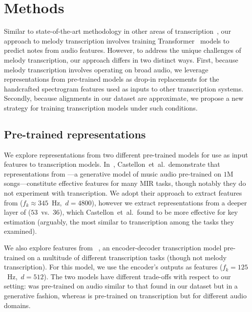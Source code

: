 \section{Methods}

Similar to state-of-the-art methodology in other areas of transcription~\cite{hawthorne2021sequence}, 
our approach to melody transcription involves training Transformer~\cite{vaswani2017attention} models to predict notes from audio features. 
However, to address the unique challenges of melody transcription, our approach differs in two distinct ways. 
First, because melody transcription involves operating on broad audio, we leverage representations from pre-trained models as drop-in replacements for the handcrafted spectrogram features used as inputs to other transcription systems. 
Secondly, because alignments in our dataset are approximate, we propose a new strategy for training transcription models under such conditions.

\subsection{Pre-trained representations}
\label{sec:representations}

We explore representations from two different pre-trained models for use as input features to transcription models.
In~\cite{castellon2021calm}, Castellon~et~al.\ demonstrate that representations from \jukebox---a generative model of music audio pre-trained on $1$M songs---constitute effective features for many MIR tasks, though notably they do not experiment with transcription. 
We adopt their approach to extract features from \jukebox{} (${f_k \approx 345}$~Hz,~${d = 4800}$), however we extract representations from a deeper layer of \jukebox{} ($53$~vs.~$36$), which Castellon~et~al.\ found to be more effective for key estimation (arguably, the most similar to transcription among the tasks they examined).

We also explore features from \mtthree~\cite{gardner2021mt3}, an encoder-decoder transcription model pre-trained on a multitude of different transcription tasks (though not melody transcription). 
For this model, we use the encoder's outputs as features (${f_k = 125}$~Hz,~${d = 512}$). 
The two models have different trade-offs with respect to our setting: \jukebox{} was pre-trained on audio similar to that found in our dataset but in a generative fashion, 
whereas \mtthree{} is pre-trained on transcription but for different audio domains. 

